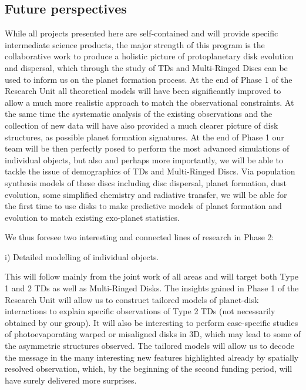 \documentclass[10pt,fleqn,twoside]{article}
\begin{document}
\subsection{Future perspectives}
%
While all projects presented here are self-contained and will
provide specific intermediate science products, the major strength of this program is the collaborative
work to produce a holistic picture of protoplanetary disk evolution
and dispersal, which through the study of TDs and Multi-Ringed Discs can be used
to inform us on the planet formation process. At the end of Phase 1 of
the Research Unit all theoretical models will have been significantly
improved to allow a much more realistic approach to match the
observational constraints. At the same time the systematic analysis of
the existing observations and the collection of new data will have also
provided a much clearer picture of disk structures, as possible planet
formation signatures. At the end of Phase 1 our team will be then
perfectly posed to perform the most advanced simulations of individual
objects, but also and perhaps more importantly, we will be able to
tackle the issue of demographics of TDs and Multi-Ringed Discs. Via population
synthesis models of these discs including disc dispersal, planet formation, dust
evolution, some simplified chemistry and radiative transfer, we will
be able for the first time to use disks to make predictive models of
planet formation and evolution to match existing exo-planet
statistics. 

\begin{highlight}
We thus foresee two interesting and connected lines of research in Phase 2: 
\end{highlight}

\begin{Emphasize}
i) Detailed modelling of individual objects.\\
\end{Emphasize}
This will follow mainly from the joint work of all areas and will
target both Type 1 and 2 TDs as well as Multi-Ringed Disks. The insights gained in
Phase 1 of the Research Unit will allow us to construct tailored
models of planet-disk interactions to explain specific observations of
Type 2 TDs (not necessarily obtained by our group). It will also be
interesting to perform case-specific studies of photoevaporating
warped or misaligned disks in 3D, which may
lead to some of the asymmetric structures observed. The tailored
models will allow us to decode the message in the many interesting new
features highlighted already by spatially resolved observation, which,
by the beginning of the second funding period, will have surely
delivered more surprises.  
\end{document}

